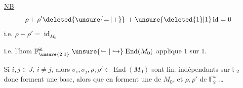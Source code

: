\uline{NB}   
\[
\rho+\rho'\deleted{\unsure{=|+}}\,+\unsure{\deleted{1}|1}\operatorname{id}=0
\]
i.e. $\rho+\rho'=\operatorname{id}_{M_0}$

i.e. l'hom $\mathbb F_{\unsure{2|1}}^{\underline\omega}\mathrel{\unsure{\lhook\joinrel\relbar|\hookrightarrow}}\operatorname{End}(M_0)$ applique $1$ sur $1$.

Si $i,j\in J$, $i\ne j$, alors $\sigma_i,\sigma_j,\rho,\rho'\in\operatorname{End}(M_0)$ sont lin. indépendants sur $\mathbb F_2$ donc forment une base,  alors que  en forment une de $M_0$, et $\rho,\rho'$ de $\mathbb F_2^{\underline\omega}$ \ldots


